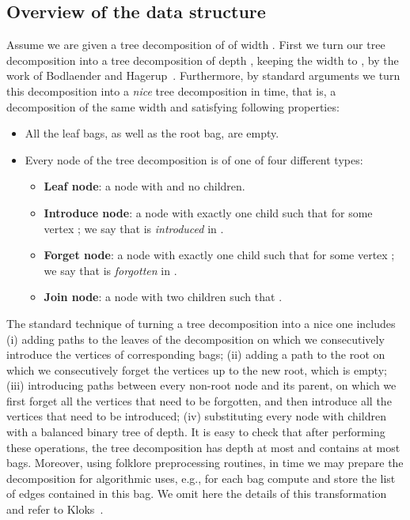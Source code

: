 \documentclass[a4paper,11pt]{article}
\theoremstyle{definition}
\theoremstyle{remark}
\begin{document}
\subsection{Overview of the data structure}
Assume we are given a tree decomposition  of  of width . First we turn our tree decomposition
into a tree decomposition of depth , keeping the width to
, by the work of Bodlaender and
Hagerup~\cite{BodlaenderH98}.  Furthermore, by standard arguments we
turn this decomposition into a {\emph{nice}} tree decomposition in
 time, that is, a decomposition of the same width
and satisfying following properties:
\begin{itemize}
\item All the leaf bags, as well as the root bag, are empty.
\item Every node of the tree decomposition is of one of four different
  types:
  \begin{itemize}
  \item {\bf{Leaf node}}: a node  with  and no children.
  \item {\bf{Introduce node}}: a node  with exactly one child 
    such that  for some vertex ; we say
    that  is {\emph{introduced}} in .
  \item {\bf{Forget node}}: a node  with exactly one child  such
    that  for some vertex ; we say
    that  is {\emph{forgotten}} in .
  \item {\bf{Join node}}: a node  with two children  such
    that .
  \end{itemize}
\end{itemize}
The standard technique of turning a tree decomposition into a nice one
includes (i) adding paths to the leaves of the decomposition on which
we consecutively introduce the vertices of corresponding bags; (ii)
adding a path to the root on which we consecutively forget the
vertices up to the new root, which is empty; (iii) introducing paths
between every non-root node and its parent, on which we first forget
all the vertices that need to be forgotten, and then introduce all the
vertices that need to be introduced; (iv) substituting every node with
 children with a balanced binary tree of  depth.  It
is easy to check that after performing these operations, the tree
decomposition has depth at most  and contains at most
 bags. Moreover, using folklore preprocessing routines,
in  time we may prepare the decomposition for
algorithmic uses, e.g., for each bag compute and store the list of
edges contained in this bag.  We omit here the details of this
transformation and refer to Kloks~\cite{Kloks93}.
\end{document}
